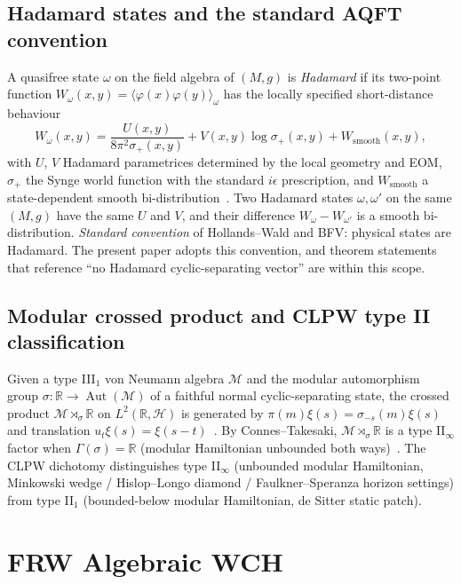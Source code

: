 \documentclass[11pt]{article}
\theoremstyle{definition}
\newcommand{\R}{\mathbb{R}}
\newcommand{\HH}{\mathcal{H}}
\newcommand{\MM}{\mathcal{M}}
\newcommand{\Aut}{\operatorname{Aut}}
\begin{document}
\subsection{Hadamard states and the standard AQFT convention}\label{sec:hadamard}

A quasifree state $\omega$ on the field algebra of $(M,g)$ is \emph{Hadamard} if its two-point function $W_\omega(x,y) = \langle\varphi(x)\varphi(y)\rangle_\omega$ has the locally specified short-distance behaviour
\begin{equation}\label{eq:hadamard}
W_\omega(x,y) = \frac{U(x,y)}{8\pi^2 \sigma_+(x,y)} + V(x,y)\log\sigma_+(x,y) + W_{\mathrm{smooth}}(x,y),
\end{equation}
with $U$, $V$ Hadamard parametrices determined by the local geometry and EOM, $\sigma_+$ the Synge world function with the standard $i\epsilon$ prescription, and $W_{\mathrm{smooth}}$ a state-dependent smooth bi-distribution~\cite{HollandsWald2001}. Two Hadamard states $\omega,\omega'$ on the same $(M,g)$ have the same $U$ and $V$, and their difference $W_\omega - W_{\omega'}$ is a smooth bi-distribution. \emph{Standard convention} of Hollands--Wald and BFV: physical states are Hadamard. The present paper adopts this convention, and theorem statements that reference ``no Hadamard cyclic-separating vector'' are within this scope.

\subsection{Modular crossed product and CLPW type II classification}\label{sec:crossed}

Given a type III$_1$ von Neumann algebra $\MM$ and the modular automorphism group $\sigma:\R\to\Aut(\MM)$ of a faithful normal cyclic-separating state, the crossed product $\MM\rtimes_\sigma\R$ on $L^2(\R,\HH)$ is generated by $\pi(m)\xi(s)=\sigma_{-s}(m)\xi(s)$ and translation $u_t\xi(s)=\xi(s-t)$~\cite{TakesakiII,Connes1973}. By Connes--Takesaki, $\MM\rtimes_\sigma\R$ is a type II$_\infty$ factor when $\Gamma(\sigma)=\R$ (modular Hamiltonian unbounded both ways)~\cite{Witten2022,CLPW2023,FaulknerSperanza2024}. The CLPW dichotomy distinguishes type II$_\infty$ (unbounded modular Hamiltonian, Minkowski wedge / Hislop--Longo diamond / Faulkner--Speranza horizon settings) from type II$_1$ (bounded-below modular Hamiltonian, de Sitter static patch).

\section{FRW Algebraic WCH}\label{sec:frw}
\end{document}
